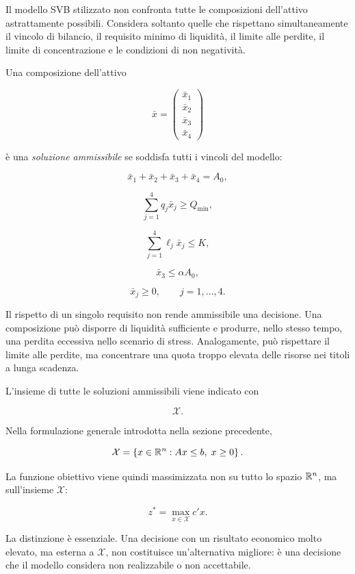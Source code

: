 \label{sec:cap11-ammissibilita}

Il modello SVB stilizzato non confronta tutte le composizioni dell'attivo
astrattamente possibili. Considera soltanto quelle che rispettano
simultaneamente il vincolo di bilancio, il requisito minimo di liquidit\`a,
il limite alle perdite, il limite di concentrazione e le condizioni di non
negativit\`a.

\begin{definition}

Una composizione dell'attivo

\[
\bar{x}
=
\begin{pmatrix}
\bar{x}_1\\
\bar{x}_2\\
\bar{x}_3\\
\bar{x}_4
\end{pmatrix}
\]

\noindent \`e una \emph{soluzione ammissibile} se soddisfa tutti i vincoli del modello:

\[
\bar{x}_1+\bar{x}_2+\bar{x}_3+\bar{x}_4=A_0,
\]

\[
\sum_{j=1}^{4}q_j\bar{x}_j\geq Q_{\min},
\]

\[
\sum_{j=1}^{4}\ell_j\bar{x}_j\leq K,
\]

\[
\bar{x}_3\leq\alpha A_0,
\]

\[
\bar{x}_j\geq0,
\qquad
j=1,\ldots,4.
\]

\end{definition}

Il rispetto di un singolo requisito non rende ammissibile una decisione.
Una composizione pu\`o disporre di liquidit\`a sufficiente e produrre, nello
stesso tempo, una perdita eccessiva nello scenario di stress. Analogamente,
pu\`o rispettare il limite alle perdite, ma concentrare una quota troppo elevata
delle risorse nei titoli a lunga scadenza.

L'insieme di tutte le soluzioni ammissibili viene indicato con

\[
\mathcal{X}.
\]

Nella formulazione generale introdotta nella sezione precedente,

\[
\mathcal{X}
=
\left\{
x\in\mathbb{R}^n:
Ax\leq b,\;
x\geq0
\right\}.
\]

La funzione obiettivo viene quindi massimizzata non su tutto lo spazio
\(\mathbb{R}^n\), ma sull'insieme \(\mathcal{X}\):

\[
z^*
=
\max_{x\in\mathcal{X}}c'x.
\]

La distinzione \`e essenziale. Una decisione con un risultato economico molto
elevato, ma esterna a \(\mathcal{X}\), non costituisce un'alternativa migliore:
\`e una decisione che il modello considera non realizzabile o non accettabile.


